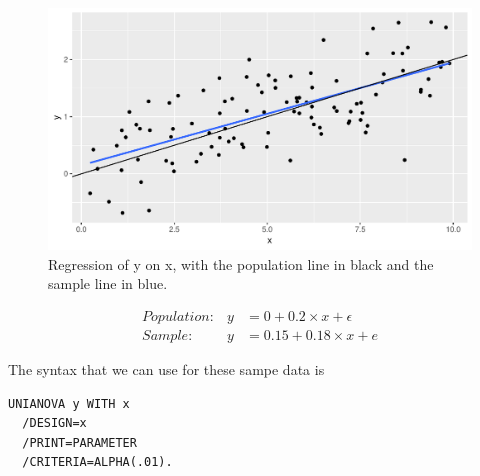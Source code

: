 \documentclass[]{book}\usepackage[]{graphicx}\usepackage[]{color}
\makeatletter
\def\maxwidth{ %
  \ifdim\Gin@nat@width>\linewidth
    \linewidth
  \else
    \Gin@nat@width
  \fi
}
\newenvironment{knitrout}{}{} %
\makeatother
\begin{document}
\begin{knitrout}
\color{fgcolor}\begin{figure}

{\centering \includegraphics[width=\maxwidth]{figure/inf_28-1} 

}

\caption[Regression of y on x, with the population line in black and the sample line in blue]{Regression of y on x, with the population line in black and the sample line in blue.}\label{fig:inf_28}
\end{figure}


\end{knitrout}

\begin{eqnarray}
Population: &y&= 0 + 0.2 \times x + \epsilon\\
Sample: &y&= 0.15 + 0.18\times x + e
\end{eqnarray}

The syntax that we can use for these sampe data is

\begin{verbatim}
UNIANOVA y WITH x
  /DESIGN=x
  /PRINT=PARAMETER
  /CRITERIA=ALPHA(.01).
\end{verbatim}
\end{document}

